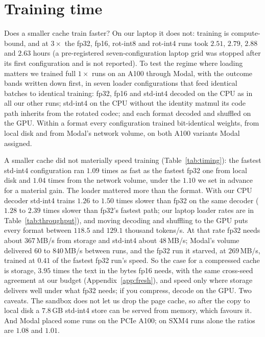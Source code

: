 \documentclass{article}
\begin{document}
\section{Training time}
\label{app:timing}
Does a smaller cache train faster? On our laptop it does not: training
is compute-bound, and at $3\times$ the fp32, fp16, rot-int8 and
rot-int4 runs took $2.51$, $2.79$, $2.88$ and $2.63$ hours (a
pre-registered seven-configuration laptop grid was stopped after its
first configuration and is not reported). To test the
regime where loading matters we trained full $1\times$ runs on an A100
through Modal, with the outcome bands written down first, in seven
loader configurations that feed identical batches to identical
training: fp32, fp16 and std-int4 decoded on the CPU as in all our
other runs; std-int4 on the CPU without the identity matmul its code
path inherits from the rotated codec; and each format decoded and
shuffled on the GPU. Within a format every configuration trained
bit-identical weights, from local disk and from Modal's network volume,
on both A100 variants Modal assigned.

A smaller cache did not materially speed training
(Table~\ref{tab:timing}): the fastest std-int4 configuration ran $1.09$
times as fast as the fastest fp32 one from local disk and $1.04$ times
from the network volume, under the $1.10$ we set in advance for a
material gain. The loader mattered more than the format. With our CPU
decoder std-int4 trains $1.26$ to $1.50$ times slower than fp32 on the
same decoder ($1.28$ to $2.39$ times slower than fp32's fastest path;
our laptop loader rates are in Table~\ref{tab:throughput}), and
moving decoding and shuffling to the GPU puts every format between
$118.5$ and $129.1$ thousand tokens/s. At that rate fp32 needs about
$367$\,MB/s from storage and std-int4 about $48$\,MB/s; Modal's volume
delivered $60$ to $840$\,MB/s between runs, and the fp32 run it
starved, at $269$\,MB/s, trained at $0.41$ of the fastest fp32 run's speed. So
the case for a compressed cache is storage, $3.95$ times the text in
the bytes fp16 needs, with the same cross-seed agreement at our budget
(Appendix~\ref{app:fresh}), and speed only where storage delivers well
under what fp32 needs; if you compress, decode on the GPU. Two
caveats. The sandbox does not let us drop the page cache, so after the
copy to local disk a $7.8$\,GB std-int4 store can be served from
memory, which favours it. And Modal placed some runs on the PCIe A100;
on SXM4 runs alone the ratios are $1.08$ and $1.01$.
\end{document}
